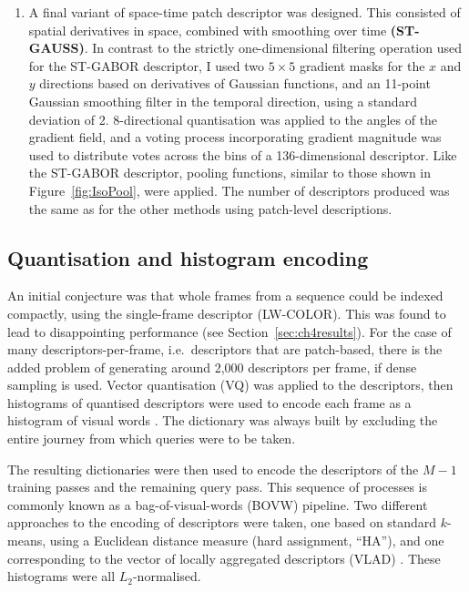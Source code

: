 \begin{enumerate}
\item A final variant of space-time patch descriptor was designed.  This consisted of spatial derivatives in space, combined with smoothing over time \textbf{(ST-GAUSS)}.  In contrast to the strictly one-dimensional filtering operation used for the ST-GABOR descriptor, I used two $5\times 5$ gradient masks for the $x$ and $y$ directions based on derivatives of Gaussian functions, and an 11-point Gaussian smoothing filter in the temporal direction, using a standard deviation of 2.  8-directional quantisation was applied to the angles of the gradient field, and a voting process incorporating gradient magnitude was used to distribute votes across the bins of a 136-dimensional descriptor.  Like the ST-GABOR descriptor, pooling functions, similar to those shown in Figure~\ref{fig:IsoPool}, were applied.  The number of descriptors produced was the same as for the other methods using patch-level descriptions.


\end{enumerate}


\subsection{Quantisation and histogram encoding}
\label{sec:quant_and_encod}
An initial conjecture was that whole frames from a sequence could be indexed compactly, using the single-frame descriptor (LW-COLOR).  This was found to lead to disappointing performance (see Section~\ref{sec:ch4results}). For the case of many descriptors-per-frame, i.e.\ descriptors that are patch-based, there is the added problem of generating around 2,000 descriptors per frame, if dense sampling is used.  Vector quantisation (VQ) was applied to the descriptors, then histograms of quantised descriptors were used to encode each frame as a histogram of visual words \citep{Csurka2004}. The dictionary was always built by excluding the entire journey from which queries were to be taken. 

The resulting dictionaries were then used to encode the descriptors of the $M-1$ training passes and the remaining query pass. This sequence of processes is commonly known as a bag-of-visual-words (BOVW) pipeline. Two different approaches to the encoding of descriptors were taken, one based on standard $k$-means, using a Euclidean distance measure (hard assignment, ``HA''), and one corresponding to the vector of locally aggregated descriptors (VLAD) \citep{Arandjelovic}. These histograms were all $L_2$-normalised.  

